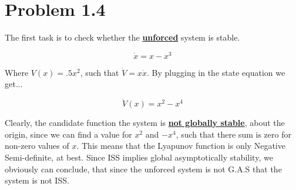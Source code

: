 \section*{Problem 1.4}



The first task is to check whether the \textbf{\underline{unforced}} system is stable.

$$
\dot{x} = x - x^3
$$

\noindent Where $V(x) = .5x^2$, such that $\dot{V} = x\dot{x}$. By plugging in the state equation we get...

$$
\dot{V}(x) = x^2 - x^4
$$

\noindent Clearly, the candidate function the system is \underline{\textbf{not globally stable}}, about the origin, since we can find a value for $x^2$ and $-x^4$, such that there sum is zero for non-zero values of $x$. This means that the Lyapunov function is only Negative Semi-definite, at best. Since ISS implies global asymptotically stability, we obviously can conclude, that since the unforced system is not G.A.S that the system is not ISS.
